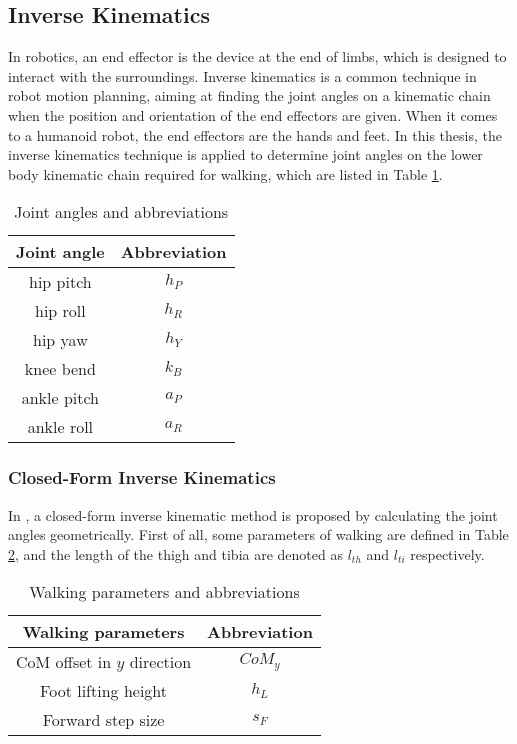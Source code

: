 \subsection{Inverse Kinematics}
\label{ik}
In robotics, an end effector is the device at the end of limbs, which is designed to interact with the surroundings. Inverse kinematics is a common technique in robot motion planning, aiming at finding the joint angles on a kinematic chain when the position and orientation of the end effectors are given\cite{spong2008robot}. When it comes to a humanoid robot, the end effectors are the hands and feet. In this thesis, the inverse kinematics technique is applied to determine joint angles on the lower body kinematic chain required for walking, which are listed in Table {\ref{Jointanglesabb}}.
\begin{table}[H]
	\centering
	\caption{Joint angles and abbreviations}
	\label{Jointanglesabb}
	\begin{tabular}{cc}
		\hline
		Joint angle & Abbreviation \\
		\hline
		hip pitch & $ h_P $ \\
		\hline
		hip roll & $ h_R $ \\
		\hline
		hip yaw & $ h_Y $\\
		\hline
		knee bend & $ k_B $ \\
		\hline 
		ankle pitch & $ a_P $ \\
		\hline
		ankle roll & $ a_R $ \\
		\hline
	\end{tabular}
\end{table}

\subsubsection{Closed-Form Inverse Kinematics}
In \cite{hengst2014runswift}, a closed-form inverse kinematic method is proposed by calculating the joint angles geometrically. First of all, some parameters of walking are defined in Table {\ref{motionparameter}}, and the length of the thigh and tibia are denoted as $ l_{th} $ and $ l_{ti} $ respectively.

\begin{table}[H]
	\centering
	\caption{Walking parameters and abbreviations}
	\label{motionparameter}
	\begin{tabular}{cc}
		\hline
		Walking parameters& Abbreviation \\
		\hline
		CoM offset in $ y $ direction & $ \mathit{CoM_{y}} $ \\
		\hline
		Foot lifting height& $ h_L $ \\
		\hline
		Forward step size & $ s_F $\\
		\hline
	\end{tabular}
\end{table}

